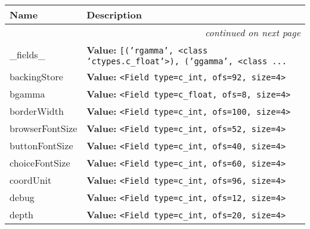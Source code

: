     \vspace{-1cm}
\hspace{\varindent}\begin{longtable}{|p{\varnamewidth}|p{\vardescrwidth}|l}
\cline{1-2}
\cline{1-2} \centering \textbf{Name} & \centering \textbf{Description}& \\
\cline{1-2}
\endhead\cline{1-2}\multicolumn{3}{r}{\small\textit{continued on next page}}\\\endfoot\cline{1-2}
\endlastfoot\raggedright \_\-f\-i\-e\-l\-d\-s\-\_\- & \raggedright \textbf{Value:} 
{\tt \texttt{[}\texttt{(}\texttt{'}\texttt{rgamma}\texttt{'}\texttt{, }{\textless}class 'ctypes.c\_float'{\textgreater}\texttt{)}\texttt{, }\texttt{(}\texttt{'}\texttt{ggamma}\texttt{'}\texttt{, }{\textless}class \texttt{...}}&\\
\cline{1-2}
\raggedright b\-a\-c\-k\-i\-n\-g\-S\-t\-o\-r\-e\- & \raggedright \textbf{Value:} 
{\tt {\textless}Field type=c\_int, ofs=92, size=4{\textgreater}}&\\
\cline{1-2}
\raggedright b\-g\-a\-m\-m\-a\- & \raggedright \textbf{Value:} 
{\tt {\textless}Field type=c\_float, ofs=8, size=4{\textgreater}}&\\
\cline{1-2}
\raggedright b\-o\-r\-d\-e\-r\-W\-i\-d\-t\-h\- & \raggedright \textbf{Value:} 
{\tt {\textless}Field type=c\_int, ofs=100, size=4{\textgreater}}&\\
\cline{1-2}
\raggedright b\-r\-o\-w\-s\-e\-r\-F\-o\-n\-t\-S\-i\-z\-e\- & \raggedright \textbf{Value:} 
{\tt {\textless}Field type=c\_int, ofs=52, size=4{\textgreater}}&\\
\cline{1-2}
\raggedright b\-u\-t\-t\-o\-n\-F\-o\-n\-t\-S\-i\-z\-e\- & \raggedright \textbf{Value:} 
{\tt {\textless}Field type=c\_int, ofs=40, size=4{\textgreater}}&\\
\cline{1-2}
\raggedright c\-h\-o\-i\-c\-e\-F\-o\-n\-t\-S\-i\-z\-e\- & \raggedright \textbf{Value:} 
{\tt {\textless}Field type=c\_int, ofs=60, size=4{\textgreater}}&\\
\cline{1-2}
\raggedright c\-o\-o\-r\-d\-U\-n\-i\-t\- & \raggedright \textbf{Value:} 
{\tt {\textless}Field type=c\_int, ofs=96, size=4{\textgreater}}&\\
\cline{1-2}
\raggedright d\-e\-b\-u\-g\- & \raggedright \textbf{Value:} 
{\tt {\textless}Field type=c\_int, ofs=12, size=4{\textgreater}}&\\
\cline{1-2}
\raggedright d\-e\-p\-t\-h\- & \raggedright \textbf{Value:} 
{\tt {\textless}Field type=c\_int, ofs=20, size=4{\textgreater}}&\\

\end{longtable}
